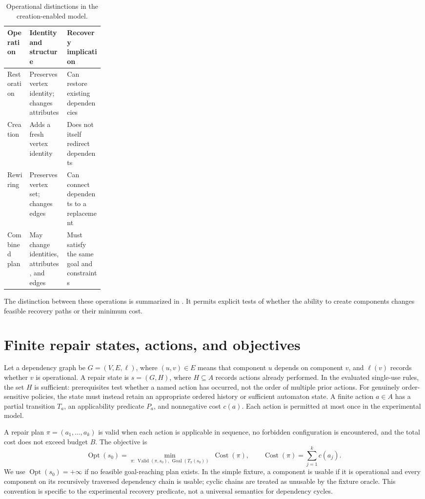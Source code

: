 \documentclass[11pt,a4paper]{article}
\newcommand{\Opt}{\operatorname{Opt}}
\newcommand{\Goal}{\operatorname{Goal}}
\newcommand{\Valid}{\operatorname{Valid}}
\newcommand{\Cost}{\operatorname{Cost}}
\begin{document}
\begin{table}[H]\centering\caption{Operational distinctions in the creation-enabled model.}\label{tab:foundations}\small
\begin{tabularx}{\linewidth}{@{}p{0.23\linewidth}XX@{}}\toprule
Operation & Identity and structure & Recovery implication\\\midrule
Restoration & Preserves vertex identity; changes attributes & Can restore existing dependencies\\
Creation & Adds a fresh vertex identity & Does not itself redirect dependents\\
Rewiring & Preserves vertex set; changes edges & Can connect dependents to a replacement\\
Combined plan & May change identities, attributes, and edges & Must satisfy the same goal and constraints\\\bottomrule
\end{tabularx}\end{table}
The distinction between these operations is summarized in . It permits explicit tests of whether the ability to create components changes feasible recovery paths or their minimum cost.

\section{Finite repair states, actions, and objectives}
Let a dependency graph be $G=(V,E,\ell)$, where $(u,v)\in E$ means that component $u$ depends on component $v$, and $\ell(v)$ records whether $v$ is operational. A repair state is $s=(G,H)$, where $H\subseteq A$ records actions already performed. In the evaluated single-use rules, the set $H$ is sufficient: prerequisites test whether a named action has occurred, not the order of multiple prior actions. For genuinely order-sensitive policies, the state must instead retain an appropriate ordered history or sufficient automaton state. A finite action $a\in A$ has a partial transition $T_a$, an applicability predicate $P_a$, and nonnegative cost $c(a)$. Each action is permitted at most once in the experimental model.

A repair plan $\pi=(a_1,\ldots,a_k)$ is valid when each action is applicable in sequence, no forbidden configuration is encountered, and the total cost does not exceed budget $B$. The objective is
\begin{equation}\label{eq:objective}
\Opt(s_0)=\min_{\pi:\,\Valid(\pi,s_0),\,\Goal(T_\pi(s_0))}\;\Cost(\pi),\qquad \Cost(\pi)=\sum_{j=1}^{k}c(a_j).
\end{equation}
We use $\Opt(s_0)=+\infty$ if no feasible goal-reaching plan exists. In the simple fixture, a component is usable if it is operational and every component on its recursively traversed dependency chain is usable; cyclic chains are treated as unusable by the fixture oracle. This convention is specific to the experimental recovery predicate, not a universal semantics for dependency cycles.
\end{document}
